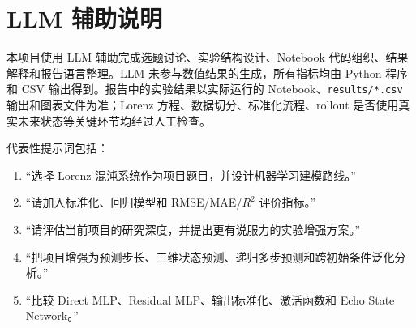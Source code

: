 \documentclass[UTF8,a4paper,12pt]{ctexart}
\begin{document}
\appendix

\section{LLM 辅助说明}

本项目使用 LLM 辅助完成选题讨论、实验结构设计、Notebook 代码组织、结果解释和报告语言整理。LLM 未参与数值结果的生成，所有指标均由 Python 程序和 CSV 输出得到。报告中的实验结果以实际运行的 Notebook、\texttt{results/*.csv} 输出和图表文件为准；Lorenz 方程、数据切分、标准化流程、rollout 是否使用真实未来状态等关键环节均经过人工检查。

代表性提示词包括：

\begin{enumerate}
    \item “选择 Lorenz 混沌系统作为项目题目，并设计机器学习建模路线。”
    \item “请加入标准化、回归模型和 RMSE/MAE/$R^2$ 评价指标。”
    \item “请评估当前项目的研究深度，并提出更有说服力的实验增强方案。”
    \item “把项目增强为预测步长、三维状态预测、递归多步预测和跨初始条件泛化分析。”
    \item “比较 Direct MLP、Residual MLP、输出标准化、激活函数和 Echo State Network。”
\end{enumerate}
\end{document}

